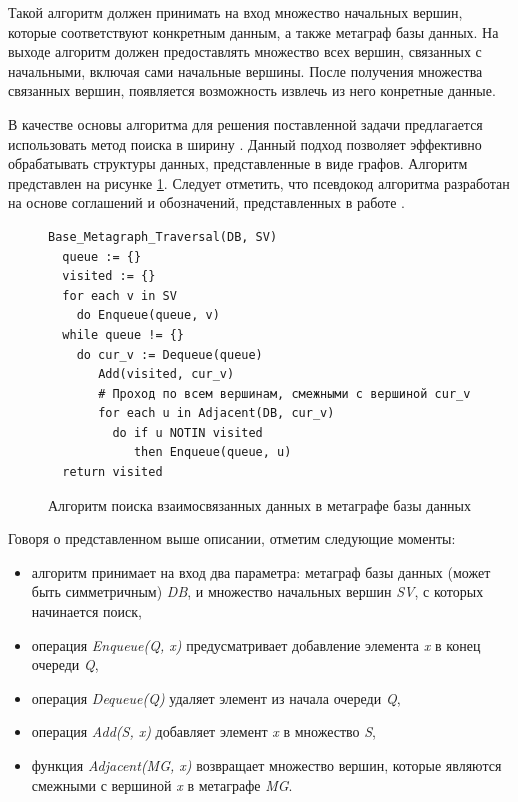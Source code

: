 Такой алгоритм должен принимать на вход множество начальных вершин, которые соответствуют конкретным данным, а также метаграф базы данных. На выходе алгоритм должен предоставлять множество всех вершин, связанных с начальными, включая сами начальные вершины. После получения множества связанных вершин, появляется возможность извлечь из него конретные данные.

В качестве основы алгоритма для решения поставленной задачи предлагается использовать метод поиска в ширину \cite{bfs}. Данный подход позволяет эффективно обрабатывать структуры данных, представленные в виде графов. Алгоритм представлен на рисунке \ref{base-algorithm}. Следует отметить, что псевдокод алгоритма разработан на основе соглашений и обозначений, представленных в работе \cite{kormen-algorithms}.

\begin{figure}
  \begin{lstlisting}
Base_Metagraph_Traversal(DB, SV)
  queue := {}
  visited := {}
  for each v in SV
    do Enqueue(queue, v)
  while queue != {}
    do cur_v := Dequeue(queue)
       Add(visited, cur_v)
       # Проход по всем вершинам, смежными с вершиной cur_v
       for each u in Adjacent(DB, cur_v)
         do if u NOTIN visited
            then Enqueue(queue, u)
  return visited
  \end{lstlisting}
  \caption{Алгоритм поиска взаимосвязанных данных в метаграфе базы данных}
  \label{base-algorithm}
\end{figure}

Говоря о представленном выше описании, отметим следующие моменты:
\begin{itemize}
  \item алгоритм принимает на вход два параметра: метаграф базы данных (может быть симметричным) \textit{DB}, и множество начальных вершин \textit{SV}, с которых начинается поиск,
  \item операция \textit{Enqueue(Q, x)} предусматривает добавление элемента \textit{x} в конец очереди \textit{Q},
  \item операция \textit{Dequeue(Q)} удаляет элемент из начала очереди \textit{Q},
  \item операция \textit{Add(S, x)} добавляет элемент \textit{x} в множество \textit{S},
  \item функция \textit{Adjacent(MG, x)} возвращает множество вершин, которые являются смежными с вершиной \textit{x} в метаграфе \textit{MG}.
\end{itemize}

